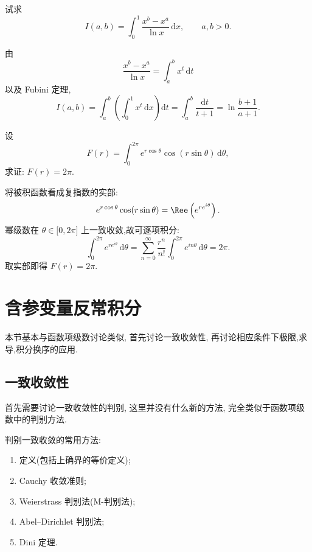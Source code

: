 \begin{example}
    试求
    \[
        I(a,b)=\int_0^1\dfrac{x^b-x^a}{\ln x}\,\mathrm{d}x,
        \qquad a,b>0.
    \]
\end{example}
\exampleblank

\begin{solution}
    由
    \[
        \dfrac{x^b-x^a}{\ln x}=\int_a^b x^t\,\mathrm{d}t
    \]
    以及 Fubini 定理,
    \[
        I(a,b)=\int_a^b\left(\int_0^1x^t\,\mathrm{d}x\right)\mathrm{d}t
        =\int_a^b\dfrac{\mathrm{d}t}{t+1}
        =\ln\dfrac{b+1}{a+1}.
    \]
\end{solution}

\begin{example}
    设
    \[
        F(r)=\int_0^{2\pi}e^{r\cos\theta}\cos(r\sin\theta)\,\mathrm{d}\theta,
    \]
    求证: $F(r)=2\pi$.
\end{example}
\exampleblank

\begin{solution}
    将被积函数看成复指数的实部:
    \[
        e^{r\cos\theta}\cos(r\sin\theta)
        =\Ree\left(e^{re^{i\theta}}\right).
    \]
    幂级数在 $\theta\in\lbrack0,2\pi\rbrack$ 上一致收敛,故可逐项积分:
    \[
        \displaystyle\int_0^{2\pi}e^{re^{i\theta}}\,\mathrm{d}\theta
        =\sum\limits_{n=0}^{\infty}\dfrac{r^n}{n!}
        \int_0^{2\pi}e^{in\theta}\,\mathrm{d}\theta
        =2\pi.
    \]
    取实部即得 $F(r)=2\pi$.
\end{solution}


\newpage

\section{含参变量反常积分}

本节基本与函数项级数讨论类似, 首先讨论一致收敛性, 再讨论相应条件下极限,求导,积分换序的应用.



\subsection{一致收敛性}

首先需要讨论一致收敛性的判别, 这里并没有什么新的方法, 完全类似于函数项级数中的判别方法.

判别一致收敛的常用方法:
\begin{enumerate}
    \item 定义(包括上确界的等价定义);
    \item Cauchy 收敛准则;
    \item Weierstrass 判别法(M-判别法);
    \item Abel--Dirichlet 判别法;
    \item Dini 定理.
\end{enumerate}

